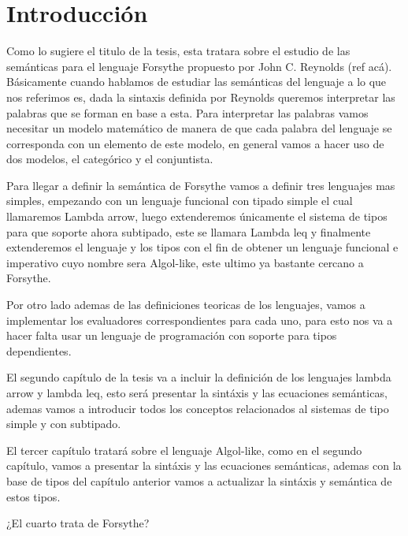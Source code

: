 \chapter{Introducci\'on}
\label{chap:intro}

Como lo sugiere el titulo de la tesis, esta tratara sobre el estudio
de las sem\'anticas para el lenguaje Forsythe propuesto por John C. Reynolds
(ref ac\'a). B\'asicamente cuando hablamos de estudiar las sem\'anticas del 
lenguaje a lo que nos referimos es, dada la sintaxis definida por Reynolds
queremos interpretar las palabras que se forman en base a esta. Para interpretar
las palabras vamos necesitar un modelo matem\'atico de manera de que
cada palabra del lenguaje se corresponda con un elemento de este modelo, 
en general vamos a hacer uso de dos modelos, el categ\'orico y el conjuntista.

Para llegar a definir la sem\'antica de Forsythe vamos a definir tres lenguajes
mas simples, empezando con un lenguaje funcional con tipado simple el cual 
llamaremos Lambda arrow, luego extenderemos \'unicamente el sistema de tipos para 
que soporte ahora subtipado, este se llamara Lambda leq y finalmente extenderemos 
el lenguaje y los tipos con el fin de obtener un lenguaje funcional e imperativo 
cuyo nombre sera Algol-like, este ultimo ya bastante cercano a Forsythe. 

Por otro lado ademas de las definiciones teoricas de los lenguajes, vamos a 
implementar los evaluadores correspondientes para cada uno, para esto nos va a 
hacer falta usar un lenguaje de programación con soporte para tipos dependientes.

El segundo cap\'itulo de la tesis va a incluir la definici\'on de los lenguajes
lambda arrow y lambda leq, esto ser\'a presentar la sint\'axis y las ecuaciones
sem\'anticas, ademas vamos a introducir todos los conceptos relacionados al 
sistemas de tipo simple y con subtipado.

El tercer cap\'itulo tratar\'a sobre el lenguaje Algol-like, como en el segundo
cap\'itulo, vamos a presentar la sint\'axis y las ecuaciones sem\'anticas, ademas
con la base de tipos del cap\'itulo anterior vamos a actualizar la sint\'axis y
sem\'antica de estos tipos.

¿El cuarto trata de Forsythe?
